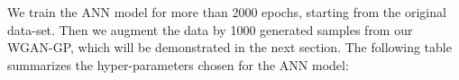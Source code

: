 \documentclass[draft, a4, 10pt, onecolumn]{IEEEtran}
\begin{document}
We train the ANN model for more than 2000 epochs, starting from the original data-set. Then we augment the data by 1000 generated samples from our WGAN-GP, which will be demonstrated in the next section. The following table summarizes the hyper-parameters chosen for the ANN model:
\begin{table}[h]
\centering
{}
\caption{Hyper-parameters chosen for the ANN model}
\end{table}
\end{document}
